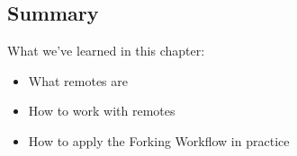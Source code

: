 \subsection{Summary}
\begin{frame}[fragile]
\subslidetitle
  What we've learned in this chapter:
  \begin{itemize}
    \item What remotes are
    \item How to work with remotes
    \item How to apply the Forking Workflow in practice
  \end{itemize}
\end{frame}
